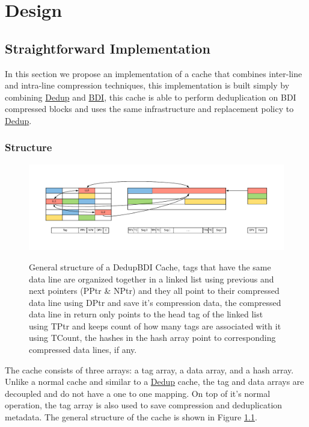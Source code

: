 
\chapter{Design}
\label{ch:Design}

\section{Straightforward Implementation}
\label{sec:Straightforward Implementation}
In this section we propose an implementation of a cache that combines inter-line and intra-line compression techniques, this implementation is built simply by combining \hyperref[sec:Dedup]{Dedup} and \hyperref[sec:BDI]{BDI}, this cache is able to perform deduplication on BDI compressed blocks and uses the same infrastructure and replacement policy to \hyperref[sec:Dedup]{Dedup}.

\subsection{Structure}
\label{ssec:DedupBDIStructure}
\begin{figure}
    \includegraphics[width=\textwidth]{DedupBDI.pdf}
    \label{fig:DedupBDI}
    \caption{General structure of a DedupBDI Cache, tags that have the same data line are organized together in a linked list using previous and next pointers (PPtr \& NPtr) and they all point to their compressed data line using DPtr and save it's compression data, the compressed data line in return only points to the head tag of the linked list using TPtr and keeps count of how many tags are associated with it using TCount, the hashes in the hash array point to corresponding compressed data lines, if any.}
\end{figure}
The cache consists of three arrays: a tag array, a data array, and a hash array. Unlike a normal cache and similar to a \hyperref[sec:Dedup]{Dedup} cache, the tag and data arrays are decoupled and do not have a one to one mapping. On top of it's normal operation, the tag array is also used to save compression and deduplication metadata. The general structure of the cache is shown in Figure \ref{fig:DedupBDI}.
